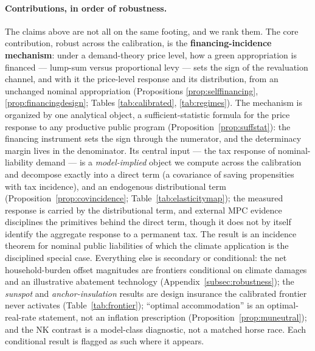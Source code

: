 \documentclass[12pt]{article}
\begin{document}
\paragraph{Contributions, in order of robustness.} The claims above are not
all on the same footing, and we rank them. The core contribution, robust
across the calibration, is the \textbf{financing-incidence mechanism}: under
a demand-theory price level, how a green appropriation is financed ---
lump-sum versus proportional levy --- sets the sign of the revaluation
channel, and with it the price-level response and its distribution, from an
unchanged nominal appropriation (Propositions \ref{prop:selffinancing},
\ref{prop:financingdesign}; Tables \ref{tab:calibrated}, \ref{tab:regimes}).
The mechanism is organized by one analytical object, a sufficient-statistic
formula for the price response to any productive public program
(Proposition~\ref{prop:suffstat}): the financing instrument sets the sign
through the numerator, and the determinacy margin lives in the denominator.
Its central input --- the tax response of nominal-liability demand --- is a
\emph{model-implied} object we compute across the calibration and decompose
exactly into a direct term (a covariance of saving propensities with tax
incidence), and an endogenous distributional term
(Proposition~\ref{prop:covincidence}; Table~\ref{tab:elasticitymap}); the
measured response is carried by the distributional term, and external MPC
evidence disciplines the primitives behind the direct term, though it does
not by itself identify the aggregate response to a permanent tax. The result is an incidence theorem for nominal
public liabilities of which the climate application is the disciplined
special case.
Everything else is secondary or conditional: the net household-burden
offset magnitudes are frontiers conditional on climate damages and an
illustrative abatement technology (Appendix~\ref{subsec:robustness}); the
\emph{sunspot} and \emph{anchor-insulation} results are design insurance the
calibrated frontier never activates (Table~\ref{tab:frontier}); ``optimal
accommodation'' is an optimal-real-rate statement, not an inflation
prescription (Proposition~\ref{prop:muneutral}); and the NK contrast is a
model-class diagnostic, not a matched horse race. Each conditional result is
flagged as such where it appears.
\end{document}
